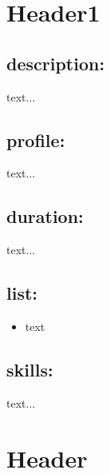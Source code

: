 \documentclass{article}[10pt]
\begin{document}
	\pagestyle{empty} %
    \tableofcontents %
    \cleardoublepage %
    \pagestyle{fancy} %
    \setcounter{page}{1} %

	\newpage
	\section{Header1}

	\subsection*{description:}
	\begin{adjustwidth}{2cm}{}
		text...
	\end{adjustwidth}
	\subsection*{profile:}
\begin{adjustwidth}{2cm}{}
	text...
\end{adjustwidth}
	\subsection*{duration:}
\begin{adjustwidth}{2cm}{}
	text...
\end{adjustwidth}

	\subsection*{list:}
\begin{adjustwidth}{1.5cm}{}
	\begin{itemize}
		\item text
	\end{itemize}
\end{adjustwidth}

	\subsection*{skills:}
\begin{adjustwidth}{2cm}{}
	text...
\end{adjustwidth}

\newpage

	\section{Header}
\end{document}
